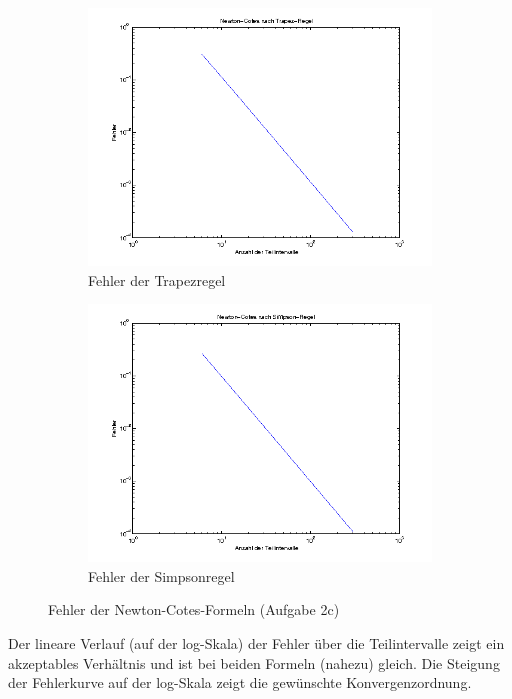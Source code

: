 \documentclass[11pt,a4paper,ngerman]{article}
\begin{document}
\begin{figure}[ht]
\centering
\begin{subfigure}{0.45\textwidth}
	\includegraphics[width=\textwidth]{trapez.png}
  \caption{Fehler der Trapezregel}
\end{subfigure}
\begin{subfigure}{0.45\textwidth}
	\includegraphics[width=\textwidth]{simpson.png}
  \caption{Fehler der Simpsonregel}
\end{subfigure}
\caption{Fehler der Newton-Cotes-Formeln (Aufgabe 2c)}
\end{figure}

Der lineare Verlauf (auf der log-Skala) der Fehler über die Teilintervalle zeigt ein akzeptables Verhältnis und ist bei beiden Formeln (nahezu) gleich. Die Steigung der Fehlerkurve auf der log-Skala zeigt die
gewünschte Konvergenzordnung.
\end{document}
